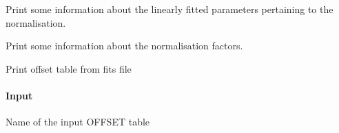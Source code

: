 \documentclass[letterpaper,10pt,english]{sphinxmanual}
\begin{document}
\begin{fulllineitems}

\begin{fulllineitems}
\label{\detokenize{api/pymusepipe:pymusepipe.align_pipe.AlignMuseDataset.show_linearfit_values}}
\pysigstartsignatures
{}
\pysigstopsignatures
\sphinxAtStartPar
Print some information about the linearly fitted parameters
pertaining to the normalisation.

\end{fulllineitems}


\begin{fulllineitems}
\label{\detokenize{api/pymusepipe:pymusepipe.align_pipe.AlignMuseDataset.show_norm_factors}}
\pysigstartsignatures
{}
\pysigstopsignatures
\sphinxAtStartPar
Print some information about the normalisation factors.

\end{fulllineitems}


\begin{fulllineitems}
\label{\detokenize{api/pymusepipe:pymusepipe.align_pipe.AlignMuseDataset.show_offset_fromfits}}
\pysigstartsignatures
{}
\pysigstopsignatures
\sphinxAtStartPar
Print offset table from fits file


\paragraph{Input}
\label{\detokenize{api/pymusepipe:id31}}\begin{description}
\sphinxAtStartPar
Name of the input OFFSET table

\end{description}


\end{fulllineitems}
\end{fulllineitems}
\end{document}
